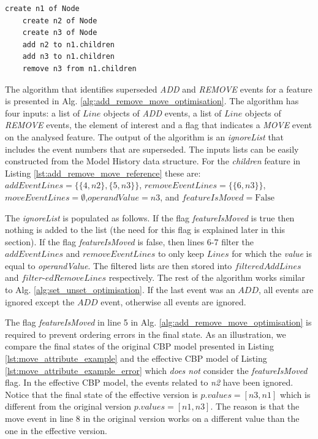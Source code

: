 \documentclass{llncs}
\begin{document}
    \begin{lstlisting}[style=eol,caption={Example of CBP representation of attribute \emph{values}'s add and remove operations.},label=lst:add_remove_move_reference]
    create n1 of Node
    create n2 of Node
    create n3 of Node
    add n2 to n1.children
    add n3 to n1.children
    remove n3 from n1.children
    \end{lstlisting}
    
    The algorithm that identifies superseded \emph{ADD} and \emph{REMOVE} events for a feature is presented in Alg. \ref{alg:add_remove_move_optimisation}.
    The algorithm has four inputs: a list of $Line$ objects of \emph{ADD} events, a list of $Line$ objects of \emph{REMOVE} events, the element of interest and a flag that indicates a \emph{MOVE} event on the analysed feature. 
    The output of the algorithm is an \emph{ignoreList} that includes the event numbers that are superseded.
    The inputs lists can be easily constructed from the Model History data structure.
    For the \emph{children} feature in Listing \ref{lst:add_remove_move_reference} these are: $addEventLines = \{  \{4, n2 \}, \{5, n3 \} \}$, $removeEventLines = \{\{6, n3 \}\}$, $moveEventLines = \emptyset$,\linebreak $operandValue = n3$, and $featureIsMoved = \mathrm{False}$
    
    The \emph{ignoreList} is populated as follows.
    If the flag \emph{featureIsMoved} is true then nothing is added to the list (the need for this flag is explained later in this section).
    If the flag \emph{featureIsMoved} is false, then lines 6-7 filter the $addEventLines$ and $removeEventLines$ to only keep $Lines$ for which the \emph{value} is equal to \emph{operandValue}.
    The filtered lists are then stored into $filteredAddLines$ and $filter$-$edRemoveLines$ respectively.
    The rest of the algorithm works similar to Alg. \ref{alg:set_unset_optimisation}. If the last event was an $ADD$, all events are ignored except the $ADD$ event, otherwise all events are ignored. 
    
    The flag \emph{featureIsMoved} in line 5 in Alg. \ref{alg:add_remove_move_optimisation} is required to prevent ordering errors in the final state.
    As an illustration, we compare the final states of the original CBP model presented in Listing  \ref{lst:move_attribute_example} and the effective CBP model of Listing \ref{lst:move_attribute_example_error} which \emph{does not} consider the \emph{featureIsMoved} flag.
    In the effective CBP model, the events related to \emph{n2} have been ignored.
    Notice that the final state of the effective version is $p.values = [n3, n1]$  which is different from the original version $p.values = [n1, n3]$.
    The reason is that the move event in line 8 in the original version works on a different value than the one in the effective version.
    
\end{document}
